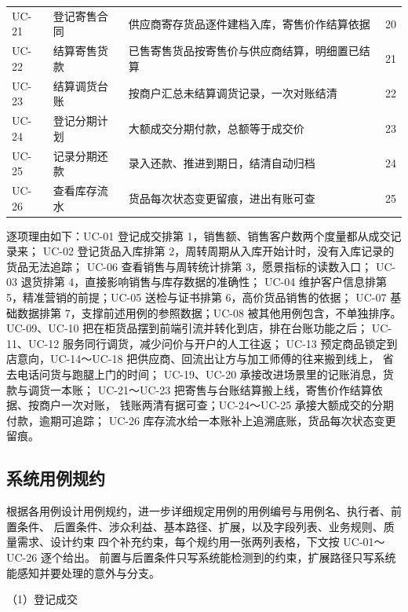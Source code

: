 \documentclass[12pt, a4paper]{ctexart}
\begin{document}
\begin{table}[H]
\begin{tabularx}{\textwidth}{@{}l l X c@{}}
UC-21 & 登记寄售合同 & 供应商寄存货品逐件建档入库，寄售价作结算依据 & 20 \\
UC-22 & 结算寄售货款 & 已售寄售货品按寄售价与供应商结算，明细置已结算 & 21 \\
UC-23 & 结算调货台账 & 按商户汇总未结算调货记录，一次对账结清 & 22 \\
UC-24 & 登记分期计划 & 大额成交分期付款，总额等于成交价 & 23 \\
UC-25 & 记录分期还款 & 录入还款、推进到期日，结清自动归档 & 24 \\
UC-26 & 查看库存流水 & 货品每次状态变更留痕，进出有账可查 & 25 \\
\bottomrule
\end{tabularx}
\end{table}

\noindent
逐项理由如下：UC-01 登记成交排第 1，销售额、销售客户数两个度量都从成交记录来；
UC-02 登记货品入库排第 2，周转周期从入库开始计时，没有入库记录的货品无法追踪；
UC-06 查看销售与周转统计排第 3，愿景指标的读数入口；
UC-03 退货排第 4，直接影响销售与库存数据的准确性；
UC-04 维护客户信息排第 5，精准营销的前提；UC-05 送检与证书排第 6，高价货品销售的依据；
UC-07 基础数据排第 7，支撑前述用例的参照数据；UC-08 被其他用例包含，不单独排序。
UC-09、UC-10 把在柜货品摆到前端引流并转化到店，排在台账功能之后；
UC-11、UC-12 服务同行调货，减少问价与开户的人工往返；
UC-13 预定商品锁定到店意向，UC-14～UC-18 把供应商、回流出让方与加工师傅的往来搬到线上，
省去电话问货与跑腿上门的时间；
UC-19、UC-20 承接改进场景里的记账消息，货款与调货一本账；
UC-21～UC-23 把寄售与台账结算搬上线，寄售价作结算依据、按商户一次对账，
钱账两清有据可查；UC-24～UC-25 承接大额成交的分期付款，逾期可追踪；
UC-26 库存流水给一本账补上追溯底账，货品每次状态变更留痕。

\subsection{系统用例规约}

根据各用例设计用例规约，进一步详细规定用例的用例编号与用例名、执行者、前置条件、
后置条件、涉众利益、基本路径、扩展，以及字段列表、业务规则、质量需求、设计约束
四个补充约束，每个规约用一张两列表格，下文按 UC-01～UC-26 逐个给出。
前置与后置条件只写系统能检测到的约束，扩展路径只写系统能感知并要处理的意外与分支。

\noindent（1）登记成交
\end{document}
